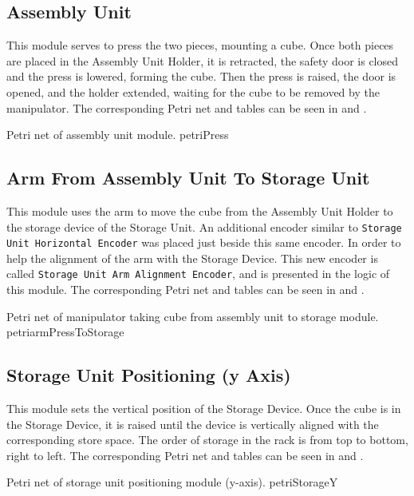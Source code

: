 \subsection{Assembly Unit}
This module serves to press the two pieces, mounting a cube. Once both pieces
are placed in the Assembly Unit Holder, it is retracted, the safety door is
closed and the press is lowered, forming the cube. Then the press is raised, the
door is opened, and the holder extended, waiting for the cube to be removed by
the manipulator.
The corresponding Petri net and tables can be seen in
 and .



{Petri net of assembly unit module.}
{petriPress}
\subsection{Arm From Assembly Unit To Storage Unit}
This module uses the arm to move the cube from the Assembly Unit Holder
to the storage device of the Storage Unit. An additional encoder similar to \newline
\verb|Storage Unit Horizontal Encoder| was placed just beside this same encoder.
In order to
help the alignment of the arm with the Storage Device. This new encoder is called \newline
\verb|Storage Unit Arm Alignment Encoder|, and is presented in the logic of this module.
The corresponding Petri net and tables can be seen in
 and .

\pagebreak

{Petri net of manipulator taking cube from assembly unit to storage module.}
{petriarmPressToStorage}
\subsection{Storage Unit Positioning (y Axis)}
This module sets the vertical position of the Storage Device. Once the cube is
in the Storage Device, it is raised until the device is vertically aligned with the
corresponding store space. The order of storage in the rack is from top to
bottom, right to left.  
The corresponding Petri net and tables can be seen in
 and .

\pagebreak

{Petri net of storage unit positioning module (y-axis).}
{petriStorageY}
